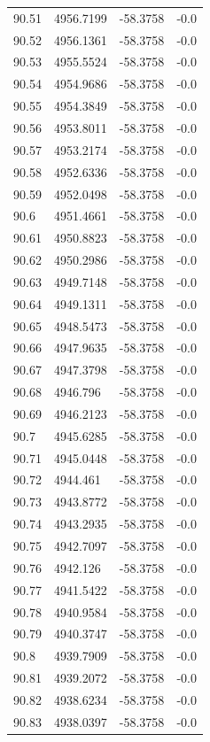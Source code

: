 \begin{table}[H]
\begin{tabular}{llll}
90.51 & 4956.7199 & -58.3758 & -0.0 \\
90.52 & 4956.1361 & -58.3758 & -0.0 \\
90.53 & 4955.5524 & -58.3758 & -0.0 \\
90.54 & 4954.9686 & -58.3758 & -0.0 \\
90.55 & 4954.3849 & -58.3758 & -0.0 \\
90.56 & 4953.8011 & -58.3758 & -0.0 \\
90.57 & 4953.2174 & -58.3758 & -0.0 \\
90.58 & 4952.6336 & -58.3758 & -0.0 \\
90.59 & 4952.0498 & -58.3758 & -0.0 \\
90.6 & 4951.4661 & -58.3758 & -0.0 \\
90.61 & 4950.8823 & -58.3758 & -0.0 \\
90.62 & 4950.2986 & -58.3758 & -0.0 \\
90.63 & 4949.7148 & -58.3758 & -0.0 \\
90.64 & 4949.1311 & -58.3758 & -0.0 \\
90.65 & 4948.5473 & -58.3758 & -0.0 \\
90.66 & 4947.9635 & -58.3758 & -0.0 \\
90.67 & 4947.3798 & -58.3758 & -0.0 \\
90.68 & 4946.796 & -58.3758 & -0.0 \\
90.69 & 4946.2123 & -58.3758 & -0.0 \\
90.7 & 4945.6285 & -58.3758 & -0.0 \\
90.71 & 4945.0448 & -58.3758 & -0.0 \\
90.72 & 4944.461 & -58.3758 & -0.0 \\
90.73 & 4943.8772 & -58.3758 & -0.0 \\
90.74 & 4943.2935 & -58.3758 & -0.0 \\
90.75 & 4942.7097 & -58.3758 & -0.0 \\
90.76 & 4942.126 & -58.3758 & -0.0 \\
90.77 & 4941.5422 & -58.3758 & -0.0 \\
90.78 & 4940.9584 & -58.3758 & -0.0 \\
90.79 & 4940.3747 & -58.3758 & -0.0 \\
90.8 & 4939.7909 & -58.3758 & -0.0 \\
90.81 & 4939.2072 & -58.3758 & -0.0 \\
90.82 & 4938.6234 & -58.3758 & -0.0 \\
90.83 & 4938.0397 & -58.3758 & -0.0 \\

\end{tabular}
\end{table}
